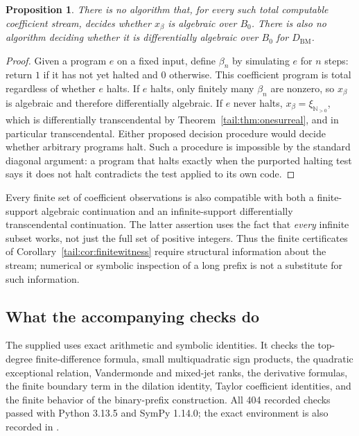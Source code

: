\documentclass[11pt,a4paper]{article}
\numberwithin{equation}{section}
\newtheorem{proposition}[theorem]{Proposition}
\theoremstyle{definition}
\theoremstyle{remark}
\newcommand{\N}{\mathbb N}
\newcommand{\BM}{D_{\mathrm{BM}}}
\begin{document}
\begin{proposition}\label{tail:prop:undecidable}
There is no algorithm that, for every such total computable coefficient
stream, decides whether $x_\beta$ is algebraic over $B_0$.
There is also no algorithm deciding whether it is differentially
algebraic over $B_0$ for $\BM$.
\end{proposition}
\begin{proof}
Given a program $e$ on a fixed input, define $\beta_n$ by simulating $e$
for $n$ steps: return $1$ if it has not yet halted and $0$ otherwise.
This coefficient program is total regardless of whether $e$ halts.
If $e$ halts, only finitely many $\beta_n$ are nonzero, so $x_\beta$ is
algebraic and therefore differentially algebraic. If $e$ never halts,
$x_\beta=\xi_{\N_{>0}}$, which is differentially transcendental by
Theorem~\ref{tail:thm:onesurreal}, and in particular transcendental.
Either proposed decision procedure would decide whether arbitrary
programs halt. Such a procedure is impossible by the standard diagonal
argument: a program that halts exactly when the purported halting test
says it does not halt contradicts the test applied to its own code.
\end{proof}

Every finite set of coefficient observations is also compatible with
both a finite-support algebraic continuation and an infinite-support
differentially transcendental continuation. The latter assertion uses
the fact that \emph{every} infinite subset works, not just the full set
of positive integers. Thus the finite certificates of
Corollary~\ref{tail:cor:finitewitness} require structural information about the
stream; numerical or symbolic inspection of a long prefix is not a
substitute for such information.

\subsection{What the accompanying checks do}
The supplied  uses exact arithmetic and symbolic
identities. It checks the top-degree finite-difference formula, small
multiquadratic sign products, the quadratic exceptional relation,
Vandermonde and mixed-jet ranks, the derivative formulas, the finite
boundary term in the dilation identity, Taylor coefficient identities,
and the finite behavior of the binary-prefix construction.
All 404 recorded checks passed with Python 3.13.5 and SymPy 1.14.0;
the exact environment is also recorded in
.
\end{document}
